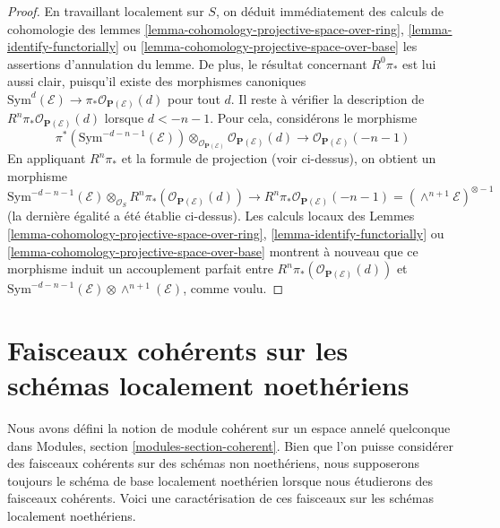 \begin{proof}
\medskip\noindent
En travaillant localement sur $S$, on déduit immédiatement des calculs de
cohomologie des lemmes \ref{lemma-cohomology-projective-space-over-ring},
\ref{lemma-identify-functorially} ou
\ref{lemma-cohomology-projective-space-over-base} les assertions d'annulation
du lemme. De plus, le résultat concernant $R^0\pi_*$ est lui
aussi clair, puisqu'il existe des morphismes canoniques
$\text{Sym}^d(\mathcal{E}) \to \pi_* \mathcal{O}_{\mathbf{P}(\mathcal{E})}(d)$
pour tout $d$. Il reste à vérifier la description de
$R^n\pi_*\mathcal{O}_{\mathbf{P}(\mathcal{E})}(d)$
lorsque $d < -n - 1$. Pour cela, considérons le morphisme
$$
\pi^*(\text{Sym}^{-d - n - 1}(\mathcal{E}))
\otimes_{\mathcal{O}_{\mathbf{P}(\mathcal{E})}}
\mathcal{O}_{\mathbf{P}(\mathcal{E})}(d)
\longrightarrow
\mathcal{O}_{\mathbf{P}(\mathcal{E})}(-n - 1)
$$
En appliquant $R^n\pi_*$ et la formule de projection (voir ci-dessus), on obtient un morphisme
$$
\text{Sym}^{-d - n - 1}(\mathcal{E})
\otimes_{\mathcal{O}_S}
R^n\pi_*(\mathcal{O}_{\mathbf{P}(\mathcal{E})}(d))
\longrightarrow
R^n\pi_*\mathcal{O}_{\mathbf{P}(\mathcal{E})}(-n - 1) =
(\wedge^{n + 1}\mathcal{E})^{\otimes -1}
$$
(la dernière égalité a été établie
ci-dessus). Les calculs locaux des Lemmes
\ref{lemma-cohomology-projective-space-over-ring},
\ref{lemma-identify-functorially} ou
\ref{lemma-cohomology-projective-space-over-base}
montrent à nouveau que ce morphisme induit un accouplement parfait entre
$R^n\pi_*(\mathcal{O}_{\mathbf{P}(\mathcal{E})}(d))$ et
$\text{Sym}^{-d - n - 1}(\mathcal{E}) \otimes \wedge^{n + 1}(\mathcal{E})$,
comme voulu.
\end{proof}

















\section{Faisceaux cohérents sur les schémas localement noethériens}
\label{section-coherent-sheaves}

\noindent
Nous avons défini la notion de module cohérent sur un espace annelé quelconque dans
Modules, section \ref{modules-section-coherent}.
Bien que l'on puisse considérer des faisceaux cohérents sur des schémas
non noethériens, nous supposerons toujours le schéma de base localement noethérien lorsque
nous étudierons des faisceaux cohérents. Voici une caractérisation de ces faisceaux
sur les schémas localement noethériens.

